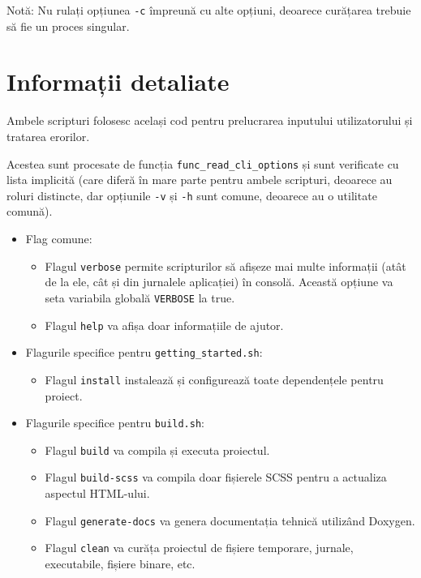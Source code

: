 Notă: Nu rulați opțiunea \texttt{-c} împreună cu alte opțiuni, deoarece curățarea trebuie să fie un proces singular.

\section{Informații detaliate}
Ambele scripturi folosesc același cod pentru prelucrarea inputului utilizatorului și tratarea erorilor.

Acestea sunt procesate de funcția \texttt{func\_read\_cli\_options} și sunt verificate cu lista implicită (care diferă în mare parte pentru ambele scripturi, deoarece au roluri distincte, dar opțiunile \texttt{-v} și \texttt{-h} sunt comune, deoarece au o utilitate comună).

\begin{itemize}
  \item Flag comune:
    \begin{itemize}
      \item Flagul \texttt{verbose} permite scripturilor să afișeze mai multe informații (atât de la ele, cât și din jurnalele aplicației) în consolă. Această opțiune va seta variabila globală \texttt{VERBOSE} la true.
      \item Flagul \texttt{help} va afișa doar informațiile de ajutor.
    \end{itemize}
  \item Flagurile specifice pentru \texttt{getting\_started.sh}:
    \begin{itemize}
      \item Flagul \texttt{install} instalează și configurează toate dependențele pentru proiect.
    \end{itemize}
  \item Flagurile specifice pentru \texttt{build.sh}:
    \begin{itemize}
      \item Flagul \texttt{build} va compila și executa proiectul.
      \item Flagul \texttt{build-scss} va compila doar fișierele SCSS pentru a actualiza aspectul HTML-ului.
      \item Flagul \texttt{generate-docs} va genera documentația tehnică utilizând Doxygen.
      \item Flagul \texttt{clean} va curăța proiectul de fișiere temporare, jurnale, executabile, fișiere binare, etc.
    \end{itemize}
\end{itemize}

